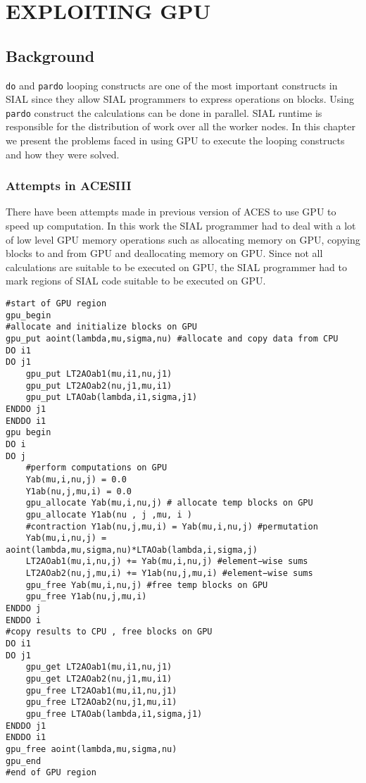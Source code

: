 \chapter{EXPLOITING GPU}\label{exploitinggpu}
\section{Background}
\texttt{do} and \texttt{pardo} looping constructs are one of the most important
constructs in SIAL since they allow SIAL programmers to express operations on
blocks. Using \texttt{pardo} construct the calculations can be done in parallel.
SIAL runtime is responsible for the distribution of work over all the worker nodes.
In this chapter we present the problems faced in using GPU to execute the looping
constructs and how they were solved.

\subsection{Attempts in ACESIII}
There have been attempts\cite{jindal2016gpusial} made in previous version of ACES
to use GPU to speed up computation. In this work the SIAL programmer had to deal
with a lot of low level GPU memory operations such as allocating memory on GPU,
copying blocks to and from GPU and deallocating memory on GPU. Since not all
calculations are suitable to be executed on GPU, the SIAL programmer had to mark
regions of SIAL code suitable to be executed on GPU.

\begin{lstlisting}[caption={Code Fragment from ACESIII for CCSD calculation},
  label={lst:ACESIII_gpucode}]
#start of GPU region
gpu_begin
#allocate and initialize blocks on GPU
gpu_put aoint(lambda,mu,sigma,nu) #allocate and copy data from CPU
DO i1
DO j1
    gpu_put LT2AOab1(mu,i1,nu,j1)
    gpu_put LT2AOab2(nu,j1,mu,i1)
    gpu_put LTAOab(lambda,i1,sigma,j1)
ENDDO j1
ENDDO i1
gpu begin
DO i
DO j
    #perform computations on GPU
    Yab(mu,i,nu,j) = 0.0
    Y1ab(nu,j,mu,i) = 0.0
    gpu_allocate Yab(mu,i,nu,j) # allocate temp blocks on GPU
    gpu_allocate Y1ab(nu , j ,mu, i )
    #contraction Y1ab(nu,j,mu,i) = Yab(mu,i,nu,j) #permutation
    Yab(mu,i,nu,j) = aoint(lambda,mu,sigma,nu)*LTAOab(lambda,i,sigma,j)
    LT2AOab1(mu,i,nu,j) += Yab(mu,i,nu,j) #element−wise sums
    LT2AOab2(nu,j,mu,i) += Y1ab(nu,j,mu,i) #element−wise sums
    gpu_free Yab(mu,i,nu,j) #free temp blocks on GPU
    gpu_free Y1ab(nu,j,mu,i)
ENDDO j
ENDDO i
#copy results to CPU , free blocks on GPU
DO i1
DO j1
    gpu_get LT2AOab1(mu,i1,nu,j1)
    gpu_get LT2AOab2(nu,j1,mu,i1)
    gpu_free LT2AOab1(mu,i1,nu,j1)
    gpu_free LT2AOab2(nu,j1,mu,i1)
    gpu_free LTAOab(lambda,i1,sigma,j1)
ENDDO j1
ENDDO i1
gpu_free aoint(lambda,mu,sigma,nu)
gpu_end
#end of GPU region
\end{lstlisting}

